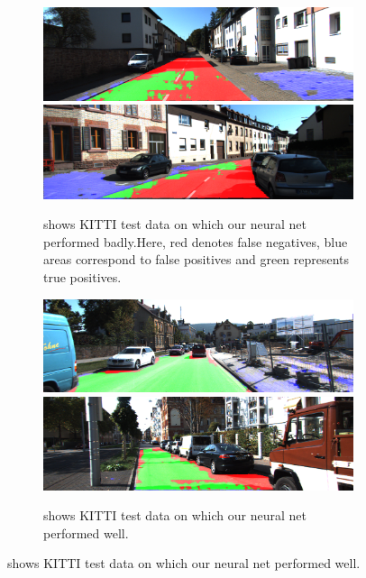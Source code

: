   \begin{figure}[]
  	\begin{subfigure}[t]{\columnwidth}
  		
  		\includegraphics[width=\columnwidth]{figures/kitty_eval/Persp_um_road_000077.png}
  		\includegraphics[width=\columnwidth]{figures/kitty_eval/Persp_um_road_000095.png}
  		\caption{shows KITTI test data on which our neural net performed badly.Here, red denotes false negatives, blue areas correspond to false positives and green represents true positives.}
  		\label{fig:sfig1}
  	\end{subfigure}
  	\begin{subfigure}[t]{\columnwidth}  
  		\includegraphics[width=\columnwidth]{figures/kitty_eval/Persp_uu_road_000027.png}
  		\includegraphics[width=\columnwidth]{figures/kitty_eval/Persp_uu_road_000082.png}
  		\caption{shows KITTI test data on which our neural net performed well.}
  		\label{fig:sfig2}
  	\end{subfigure}
  \end{figure}
  
